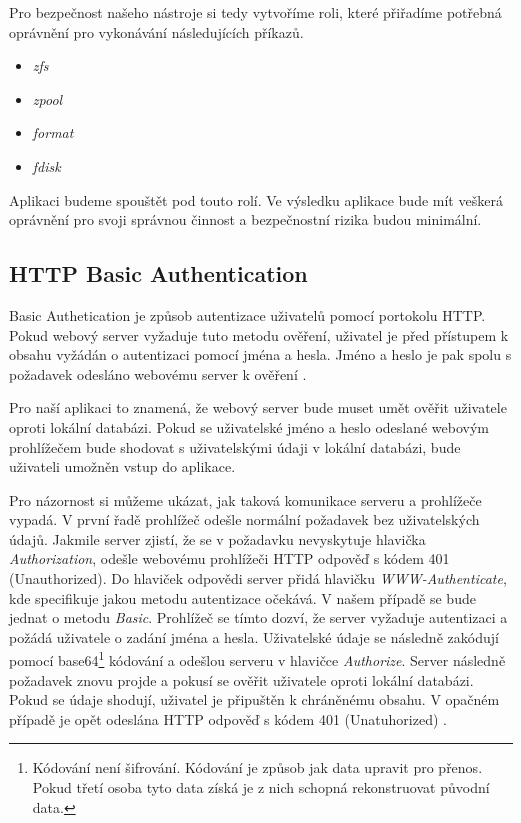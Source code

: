     Pro bezpečnost našeho nástroje si tedy vytvoříme roli, které přiřadíme potřebná oprávnění pro vykonávání následujících příkazů.
    \begin{itemize}
      \item \emph{zfs}
      \item \emph{zpool}
      \item \emph{format}
      \item \emph{fdisk}      
    \end{itemize}

    Aplikaci budeme spouštět pod touto rolí. Ve výsledku aplikace bude mít veškerá oprávnění pro svoji správnou činnost a bezpečnostní rizika budou minimální.
    \subsection{HTTP Basic Authentication}
    \label{httpauth}
    Basic Authetication je způsob autentizace uživatelů pomocí portokolu HTTP. Pokud webový server vyžaduje tuto metodu ověření, uživatel je před přístupem k obsahu vyžádán o autentizaci pomocí jména a hesla. Jméno a heslo je pak spolu s požadavek odesláno webovému server k ověření \cite{RFC2617}.

    Pro naší aplikaci to znamená, že webový server bude muset umět ověřit uživatele oproti lokální databázi. Pokud se uživatelské jméno a heslo odeslané webovým prohlížečem bude shodovat s uživatelskými údaji v lokální databázi, bude uživateli umožněn vstup do aplikace.

    Pro názornost si můžeme ukázat, jak taková komunikace serveru a prohlížeče vypadá. V první řadě prohlížeč odešle normální požadavek bez uživatelských údajů. Jakmile server zjistí, že se v požadavku nevyskytuje hlavička \emph{Authorization}, odešle webovému prohlížeči HTTP odpověď s kódem 401 (Unauthorized). Do hlaviček odpovědi server přidá hlavičku \emph{WWW-Authenticate}, kde specifikuje jakou metodu autentizace očekává. V našem případě se bude jednat o metodu \emph{Basic}. Prohlížeč se tímto dozví, že server vyžaduje autentizaci a požádá uživatele o zadání jména a hesla. Uživatelské údaje se následně zakódují pomocí base64\footnote{Kódování není šifrování. Kódování je způsob jak data upravit pro přenos. Pokud třetí osoba tyto data získá je z nich schopná rekonstruovat původní data.} kódování a odešlou serveru v hlavičce \emph{Authorize}. Server následně požadavek znovu projde a pokusí se ověřit uživatele oproti lokální databázi. Pokud se údaje shodují, uživatel je připuštěn k chráněnému obsahu. V opačném případě je opět odeslána HTTP odpověď s kódem 401 (Unatuhorized) \cite{RFC2617}.

